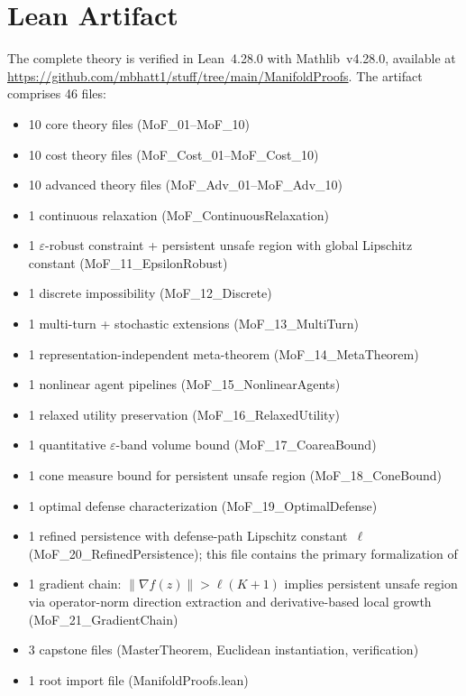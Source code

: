 \documentclass[11pt]{article}
\begin{document}
\section{Lean Artifact}
\label{app:artifact}

The complete theory is verified in Lean~4.28.0 with Mathlib~v4.28.0,
available at
\url{https://github.com/mbhatt1/stuff/tree/main/ManifoldProofs}.
The artifact comprises 46 files:
\begin{itemize}[nosep]
  \item 10 core theory files (MoF\_01--MoF\_10)
  \item 10 cost theory files (MoF\_Cost\_01--MoF\_Cost\_10)
  \item 10 advanced theory files (MoF\_Adv\_01--MoF\_Adv\_10)
  \item 1 continuous relaxation (MoF\_ContinuousRelaxation)
  \item 1 $\varepsilon$-robust constraint + persistent unsafe region
    with global Lipschitz constant
    (MoF\_11\_EpsilonRobust)
  \item 1 discrete impossibility (MoF\_12\_Discrete)
  \item 1 multi-turn + stochastic extensions
    (MoF\_13\_MultiTurn)
  \item 1 representation-independent meta-theorem
    (MoF\_14\_MetaTheorem)
  \item 1 nonlinear agent pipelines (MoF\_15\_NonlinearAgents)
  \item 1 relaxed utility preservation (MoF\_16\_RelaxedUtility)
  \item 1 quantitative $\varepsilon$-band volume bound
    (MoF\_17\_CoareaBound)
  \item 1 cone measure bound for persistent unsafe region
    (MoF\_18\_ConeBound)
  \item 1 optimal defense characterization
    (MoF\_19\_OptimalDefense)
  \item 1 refined persistence with defense-path Lipschitz constant~$\ell$
    (MoF\_20\_RefinedPersistence); this file contains the primary
    formalization of 
  \item 1 gradient chain: $\|\nabla f(z)\| > \ell(K+1)$ implies
    persistent unsafe region via operator-norm direction extraction
    and derivative-based local growth
    (MoF\_21\_GradientChain)
  \item 3 capstone files (MasterTheorem, Euclidean instantiation,
    verification)
  \item 1 root import file (ManifoldProofs.lean)
\end{itemize}
\end{document}
